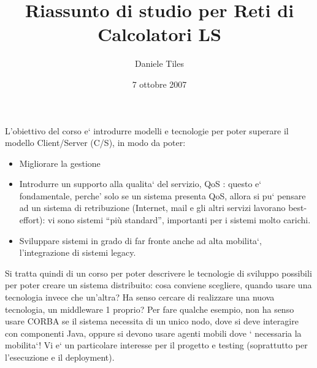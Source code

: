 \documentclass[a4paper,12pt]{article}
\title{Riassunto di studio per Reti di Calcolatori LS}
\author{Daniele Tiles}
\date{7 ottobre 2007}
\begin{document}
\maketitle
\tableofcontents
\newpage

L'obiettivo del corso e` introdurre modelli e tecnologie per poter superare il modello Client/Server (C/S), in modo 
da poter:
\begin{itemize}
 \item Migliorare la gestione
 \item Introdurre un supporto alla qualita` del servizio, QoS : questo e` fondamentale, perche' solo se un sistema
presenta QoS, allora si pu` pensare ad un sistema di retribuzione (Internet, mail e gli altri servizi lavorano
best-effort): vi sono sistemi ``più standard'', importanti per i sistemi molto carichi.
\item Sviluppare sistemi in grado di far fronte anche ad alta mobilita`, l'integrazione di sistemi legacy.
\end{itemize}

Si tratta quindi di un corso per poter descrivere le tecnologie di sviluppo possibili per poter creare un sistema
distribuito: cosa conviene scegliere, quando usare una tecnologia invece che un'altra? Ha senso cercare di realizzare
una nuova tecnologia, un middleware 1 proprio? Per fare qualche esempio, non ha senso usare CORBA se il sistema
necessita di un unico nodo, dove si deve interagire con componenti Java, oppure si devono usare agenti mobili dove `
necessaria la mobilita`! Vi e` un particolare interesse per il progetto e testing (soprattutto per l'esecuzione e il
deployment).
\end{document}
